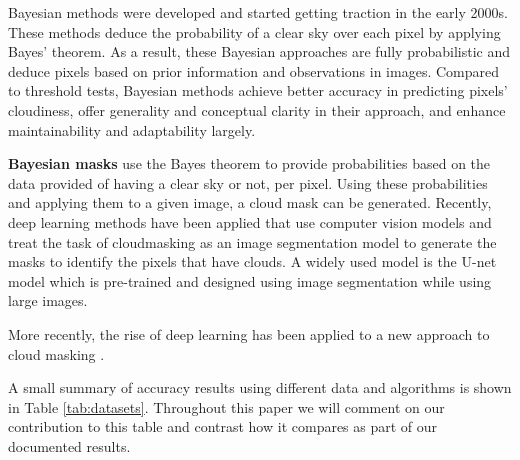 \documentclass[sigplan,screen]{acmart}
\begin{document}

Bayesian methods were developed and started getting traction in the early 2000s. These methods deduce the probability of a clear sky over each pixel by applying Bayes' theorem. As a result, these Bayesian approaches are fully probabilistic and deduce pixels based on prior information and observations in images. Compared to threshold tests, Bayesian methods achieve better accuracy in predicting pixels' cloudiness, offer generality and conceptual clarity in their approach, and enhance maintainability and adaptability largely. 

{\bf Bayesian masks} use the Bayes theorem to provide probabilities based on the data provided of having a clear sky or not, per pixel. Using these probabilities and applying them to a given image, a cloud mask can be generated. Recently,  deep learning methods \cite{WIELAND2019111203,Yan2018CloudAC} have been applied that use computer vision models and treat the task of cloudmasking as an image segmentation model to generate the masks to identify the pixels that have clouds. A widely used model is the U-net model \cite{Ronneberger2015UNetCN} which is pre-trained and designed  using image segmentation while using large images.

More recently, the rise of deep learning has been applied to a new approach to cloud masking \cite{Thiyagalingam2022AIBF}. 


A small summary of accuracy results using different data and algorithms is shown in Table \ref{tab:datasets}. Throughout this paper we will comment on our contribution to this table and contrast how it compares as part of our documented results.

\end{document}
